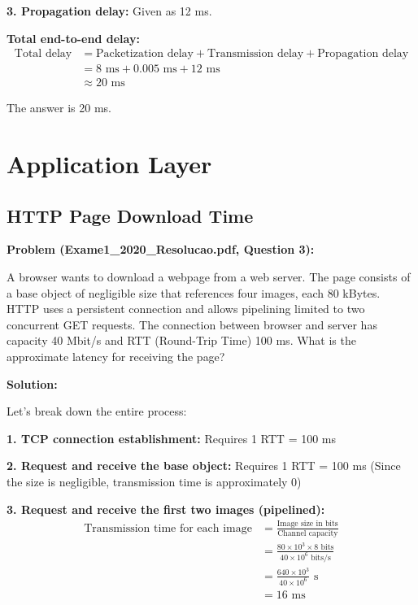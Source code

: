 \documentclass[11pt,a4paper]{article}
\begin{document}
\textbf{3. Propagation delay:}
Given as 12 ms.

\textbf{Total end-to-end delay:}
\begin{align}
    \text{Total delay} &= \text{Packetization delay} + \text{Transmission delay} + \text{Propagation delay}\\
    &= 8 \text{ ms} + 0.005 \text{ ms} + 12 \text{ ms}\\
    &\approx 20 \text{ ms}
\end{align}

The answer is 20 ms.

\section{Application Layer}

\subsection{HTTP Page Download Time}
\textbf{Problem (Exame1\_2020\_Resolucao.pdf, Question 3):}

A browser wants to download a webpage from a web server. The page consists of a base object of negligible size that references four images, each 80 kBytes. HTTP uses a persistent connection and allows pipelining limited to two concurrent GET requests. The connection between browser and server has capacity 40 Mbit/s and RTT (Round-Trip Time) 100 ms. What is the approximate latency for receiving the page?

\textbf{Solution:}

Let's break down the entire process:

\textbf{1. TCP connection establishment:} Requires 1 RTT = 100 ms

\textbf{2. Request and receive the base object:} Requires 1 RTT = 100 ms
(Since the size is negligible, transmission time is approximately 0)

\textbf{3. Request and receive the first two images (pipelined):}
\begin{align}
    \text{Transmission time for each image} &= \frac{\text{Image size in bits}}{\text{Channel capacity}}\\
    &= \frac{80 \times 10^3 \times 8 \text{ bits}}{40 \times 10^6 \text{ bits/s}}\\
    &= \frac{640 \times 10^3}{40 \times 10^6} \text{ s}\\
    &= 16 \text{ ms}
\end{align}
\end{document}
